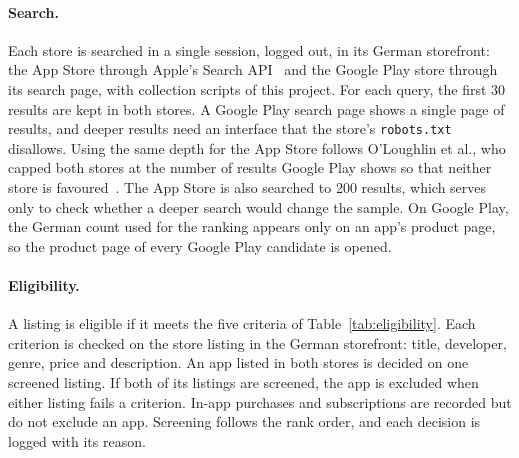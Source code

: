 \paragraph{Search.} Each store is searched in a single session, logged out, in
its German storefront: the App Store through Apple's Search
API~\parencite{apple2022itunessearch} and the Google Play store through its
search page, with collection scripts of this project. For each query,
the first 30 results are kept in both stores. A Google Play search page shows
a single page of results, and deeper results need an interface that the store's
\texttt{robots.txt} disallows. Using the same depth for the App Store follows
O'Loughlin et al., who capped both stores at the number of results Google Play
shows so that neither store is favoured~\parencite{oloughlin2019reviewing}. The
App Store is also searched to 200 results, which serves only to check whether
a deeper search would change the sample. On Google Play, the German count used
for the ranking appears only on an app's product page, so the product page of
every Google Play candidate is opened.

\paragraph{Eligibility.} A listing is eligible if it meets the five criteria
of Table~\ref{tab:eligibility}. Each criterion is checked on the store listing
in the German storefront: title, developer, genre, price and description. An
app listed in both stores is decided on one screened listing. If both of its
listings are screened, the app is excluded when either listing fails a
criterion. In-app purchases
and subscriptions are recorded but do not exclude an app. Screening follows the
rank order, and each decision is logged with its reason.

